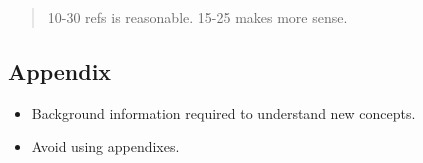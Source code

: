 \documentclass[
  10pt,
  draftcls,
  technote,
  letterpaper,
  oneside,
  onecolumn]{IEEEtran}
\providecommand{\tightlist}{%
  \setlength{\itemsep}{0pt}\setlength{\parskip}{0pt}}
\newlength{\cslhangindent}
\newlength{\cslentryspacingunit} %
\newenvironment{CSLReferences}[2] %
 {%
  \setlength{\parindent}{0pt}
  \ifodd #1
  \let\oldpar\par
  \def\par{\hangindent=\cslhangindent\oldpar}
  \fi
  \setlength{\parskip}{#2\cslentryspacingunit}
 }%
 {}
\begin{document}
\begin{quote}
10-30 refs is reasonable. 15-25 makes more sense.
\end{quote}

\hypertarget{refs}{}
\begin{CSLReferences}{0}{0}
\end{CSLReferences}

\appendix

\hypertarget{appendix}{%
\subsection{Appendix}\label{appendix}}

\begin{itemize}
\tightlist
\item
  Background information required to understand new concepts.
\item
  Avoid using appendixes.
\end{itemize}
\end{document}
